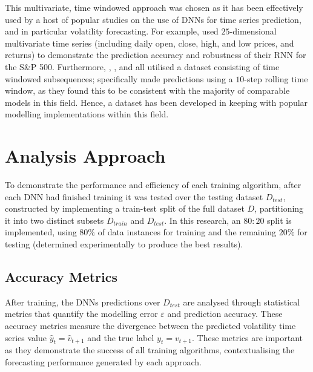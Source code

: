 \documentclass[a4paper, 11pt]{report}
\begin{document}
    This multivariate, time windowed approach was chosen as it has been effectively used by a host of popular studies on the use of DNNs for time series prediction, and in particular volatility forecasting. For example, \citet{xiong-2016} used $25$-dimensional multivariate time series (including daily open, close, high, and low prices, and returns) to demonstrate the prediction accuracy and robustness of their RNN for the S\&P 500. Furthermore, \citet{xiong-2016}, \citet{bucci-2020}, and \citet{rodikov-2022} all utilised a dataset consisting of time windowed subsequences; \citet{xiong-2016} specifically made predictions using a $10$-step rolling time window, as they found this to be consistent with the majority of comparable models in this field. Hence, a dataset has been developed in keeping with popular modelling implementations within this field.


    \section{Analysis Approach}
    \label{section: metrics}

    To demonstrate the performance and efficiency of each training algorithm, after each DNN had finished training it was tested over the testing dataset $D_{test}$, constructed by implementing a train-test split of the full dataset $D$, partitioning it into two distinct subsets $D_{train}$ and $D_{test}$. In this research, an $80 \colon 20$ split is implemented, using $80\%$ of data instances for training and the remaining $20\%$ for testing (determined experimentally to produce the best results).
    




    \subsection{Accuracy Metrics}
    \label{section: accuracy-metrics}

    After training, the DNNs predictions over $D_{test}$ are analysed through statistical metrics that quantify the modelling error $\varepsilon$ and prediction accuracy. These accuracy metrics measure the divergence between the predicted volatility time series value $\hat{y}_t = \hat{v}_{t+1}$ and the true label $y_t = v_{t+1}$. These metrics are important as they demonstrate the success of all training algorithms, contextualising the forecasting performance generated by each approach.
\end{document}
